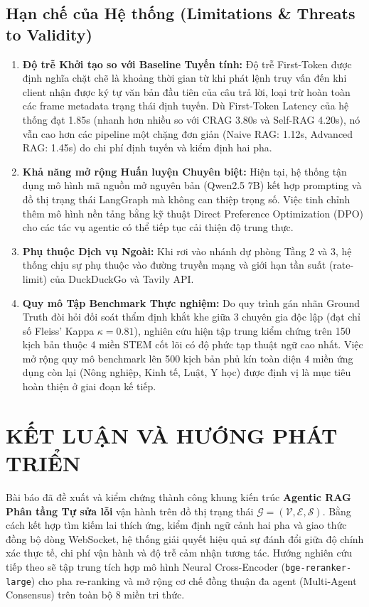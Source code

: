 \documentclass[conference]{IEEEtran}
\begin{document}
\subsection{Hạn chế của Hệ thống (Limitations \& Threats to Validity)}
\begin{enumerate}
    \item \textbf{Độ trễ Khởi tạo so với Baseline Tuyến tính:} Độ trễ First-Token được định nghĩa chặt chẽ là khoảng thời gian từ khi phát lệnh truy vấn đến khi client nhận được ký tự văn bản đầu tiên của câu trả lời, loại trừ hoàn toàn các frame metadata trạng thái định tuyến. Dù First-Token Latency của hệ thống đạt 1.85s (nhanh hơn nhiều so với CRAG 3.80s và Self-RAG 4.20s), nó vẫn cao hơn các pipeline một chặng đơn giản (Naive RAG: 1.12s, Advanced RAG: 1.45s) do chi phí định tuyến và kiểm định hai pha.
    \item \textbf{Khả năng mở rộng Huấn luyện Chuyên biệt:} Hiện tại, hệ thống tận dụng mô hình mã nguồn mở nguyên bản (Qwen2.5 7B) kết hợp prompting và đồ thị trạng thái LangGraph mà không can thiệp trọng số. Việc tinh chỉnh thêm mô hình nền tảng bằng kỹ thuật Direct Preference Optimization (DPO) cho các tác vụ agentic có thể tiếp tục cải thiện độ trung thực.
    \item \textbf{Phụ thuộc Dịch vụ Ngoài:} Khi rơi vào nhánh dự phòng Tầng 2 và 3, hệ thống chịu sự phụ thuộc vào đường truyền mạng và giới hạn tần suất (rate-limit) của DuckDuckGo và Tavily API.
    \item \textbf{Quy mô Tập Benchmark Thực nghiệm:} Do quy trình gán nhãn Ground Truth đòi hỏi đối soát thẩm định khắt khe giữa 3 chuyên gia độc lập (đạt chỉ số Fleiss' Kappa $\kappa = 0.81$), nghiên cứu hiện tập trung kiểm chứng trên 150 kịch bản thuộc 4 miền STEM cốt lõi có độ phức tạp thuật ngữ cao nhất. Việc mở rộng quy mô benchmark lên 500 kịch bản phủ kín toàn diện 4 miền ứng dụng còn lại (Nông nghiệp, Kinh tế, Luật, Y học) được định vị là mục tiêu hoàn thiện ở giai đoạn kế tiếp.
\end{enumerate}

\section{KẾT LUẬN VÀ HƯỚNG PHÁT TRIỂN}
Bài báo đã đề xuất và kiểm chứng thành công khung kiến trúc \textbf{Agentic RAG Phân tầng Tự sửa lỗi} vận hành trên đồ thị trạng thái $\mathcal{G} = (\mathcal{V}, \mathcal{E}, \mathcal{S})$. Bằng cách kết hợp tìm kiếm lai thích ứng, kiểm định ngữ cảnh hai pha và giao thức đồng bộ dòng WebSocket, hệ thống giải quyết hiệu quả sự đánh đổi giữa độ chính xác thực tế, chi phí vận hành và độ trễ cảm nhận tương tác. Hướng nghiên cứu tiếp theo sẽ tập trung tích hợp mô hình Neural Cross-Encoder (\texttt{bge-reranker-large}) cho pha re-ranking và mở rộng cơ chế đồng thuận đa agent (Multi-Agent Consensus) trên toàn bộ 8 miền tri thức.



\end{document}
